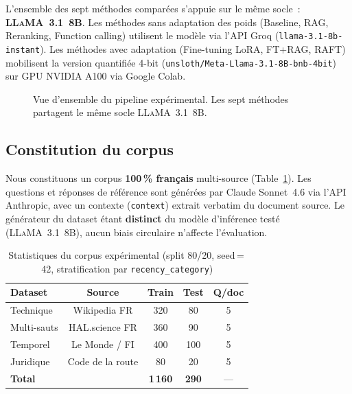 \documentclass[10pt,journal,compsoc]{IEEEtran}
\begin{document}
L'ensemble des sept méthodes comparées s'appuie sur le même socle~:
\textbf{\textsc{LLaMA}~3.1~8B}. Les méthodes sans adaptation des poids
(Baseline, RAG, Reranking, Function calling) utilisent le modèle via
l'API Groq (\texttt{llama-3.1-8b-instant}). Les méthodes avec
adaptation (Fine-tuning LoRA, FT+RAG, RAFT) mobilisent la version
quantifiée 4-bit (\texttt{unsloth/Meta-Llama-3.1-8B-bnb-4bit}) sur
GPU NVIDIA A100 via Google Colab.

\begin{figure}[H]
  \centering
  \caption{Vue d'ensemble du pipeline expérimental. Les sept méthodes
           partagent le même socle \textsc{LLaMA}~3.1~8B.}
  \label{fig:pipeline}
\end{figure}

\subsection{Constitution du corpus}
\label{subsec:corpus}

Nous constituons un corpus \textbf{100\,\% français} multi-source
(Table~\ref{tab:corpus}). Les questions et réponses de référence sont
générées par Claude Sonnet~4.6 via l'API Anthropic, avec un contexte
(\texttt{context}) extrait verbatim du document source. Le générateur
du dataset étant \textbf{distinct} du modèle d'inférence testé
(\textsc{LLaMA}~3.1~8B), aucun biais circulaire n'affecte l'évaluation.

\begin{table}[h]
  \centering
  \caption{Statistiques du corpus expérimental (split 80/20, seed\,=\,42,
           stratification par \texttt{recency\_category})}
  \label{tab:corpus}
  \renewcommand{\arraystretch}{1.25}
  \begin{tabular}{lcccc}
    \toprule
    \textbf{Dataset} & \textbf{Source} & \textbf{Train} &
    \textbf{Test} & \textbf{Q/doc} \\
    \midrule
    Technique   & Wikipedia FR      & 320 & 80  & 5 \\
    Multi-sauts & HAL.science FR    & 360 & 90  & 5 \\
    Temporel    & Le Monde / FI     & 400 & 100 & 5 \\
    Juridique   & Code de la route  & 80  & 20  & 5 \\
    \midrule
    \multicolumn{2}{l}{\textbf{Total}} &
    \textbf{1\,160} & \textbf{290} & — \\
    \bottomrule
  \end{tabular}
\end{table}
\end{document}
